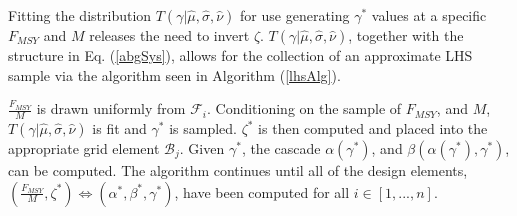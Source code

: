 \documentclass[12pt]{article}
\begin{document}
Fitting the distribution $T(\gamma|\hat\mu, \hat\sigma, \hat\nu)$ for 
use generating $\gamma^*$ values at a specific $F_{MSY}$ and $M$ releases the 
need to invert $\zeta$. $T(\gamma|\hat\mu, \hat\sigma, \hat\nu)$, together with 
the structure in Eq. (\ref{abgSys}), allows for the collection of an approximate
LHS sample via the algorithm seen in Algorithm (\ref{lhsAlg}).%

%
$\frac{F_{MSY}}{M}$ is drawn uniformly from $\mathcal{F}_i$. Conditioning on the 
sample of $F_{MSY}$, and $M$, $T(\gamma|\hat\mu, \hat\sigma, \hat\nu)$ is fit and 
$\gamma^*$ is sampled. $\zeta^*$ is then computed and placed into the appropriate
grid element $\mathcal{B}_j$. Given $\gamma^*$, the cascade $\alpha(\gamma^*)$, 
and $\beta(\alpha(\gamma^*), \gamma^*)$, can be computed. The algorithm 
continues until all of the design elements, $(\frac{F_{MSY}}{M}, \zeta^*)\Leftrightarrow(\alpha^*, \beta^*, \gamma^*)$,
have been computed for all $i\in[1,...,n]$.



\end{document}
